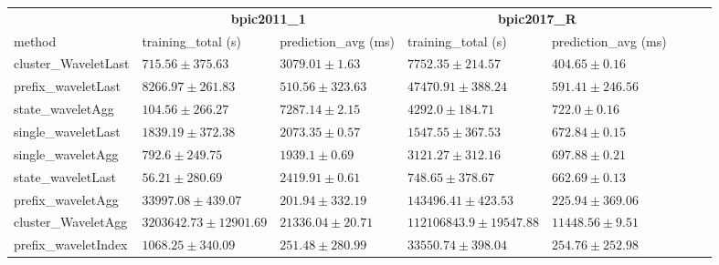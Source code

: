 \documentclass[twoside,11pt]{Latex/Classes/PhDthesisPSnPDF}
\begin{document}
\begin{table}[h]
{\begin{tabular}{llllllll}
		\bottomrule
		\toprule
		& \multicolumn{2}{c}{{\bfseries bpic2011\_1}} & \multicolumn{2}{c}{{\bfseries bpic2017\_R}} \\ \cmidrule(lr){2-3} \cmidrule(lr){4-5} \cmidrule(lr){6-7}
		method  & training\_total (s) & prediction\_avg (ms) & training\_total (s) & prediction\_avg (ms) \\ \midrule
		cluster\_WaveletLast & $715.56 \pm 375.63$ & $3079.01 \pm 1.63$ & $7752.35 \pm 214.57$ & $404.65 \pm 0.16$ \\ 
		prefix\_waveletLast & $8266.97 \pm 261.83$ & $510.56 \pm 323.63$ & $47470.91 \pm 388.24$ & $591.41 \pm 246.56$ \\ 
		state\_waveletAgg & $104.56 \pm 266.27$ & $7287.14 \pm 2.15$ & $4292.0 \pm 184.71$ & $722.0 \pm 0.16$ \\ 
		single\_waveletLast & $1839.19 \pm 372.38$ & $2073.35 \pm 0.57$ & $1547.55 \pm 367.53$ & $672.84 \pm 0.15$ \\ 
		single\_waveletAgg & $792.6 \pm 249.75$ & $1939.1 \pm 0.69$ & $3121.27 \pm 312.16$ & $697.88 \pm 0.21$ \\ 
		state\_waveletLast & $\mathbf{56.21 \pm 280.69}$ & $2419.91 \pm 0.61$ & $\mathbf{748.65 \pm 378.67}$ & $662.69 \pm 0.13$ \\ 
		prefix\_waveletAgg & $33997.08 \pm 439.07$ & $\mathbf{201.94 \pm 332.19}$ & $143496.41 \pm 423.53$ & $\mathbf{225.94 \pm 369.06}$ \\ 
		cluster\_WaveletAgg & $3203642.73 \pm 12901.69$ & $21336.04 \pm 20.71$ & $112106843.9 \pm 19547.88$ & $11448.56 \pm 9.51$ \\ 
		prefix\_waveletIndex & $1068.25 \pm 340.09$ & $251.48 \pm 280.99$ & $33550.74 \pm 398.04$ & $254.76 \pm 252.98$ \\ 
		\bottomrule

		\end{tabular}%
	}	
\end{table}







\end{document}
